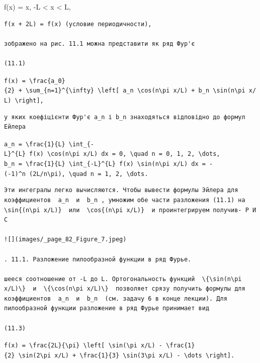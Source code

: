\documentclass[
  ukrainian,
]{article}
\begin{document}
f(x) = x, -L \textless{} x \textless{} L,

\begin{verbatim}
f(x + 2L) = f(x) (условие периодичности),

зображено на рис. 11.1 можна представити як ряд Фур'є

(11.1)
\end{verbatim}

\texttt{f(x)\ =\ \textbackslash{}frac\{a\_0\}\{2\}\ +\ \textbackslash{}sum\_\{n=1\}\^{}\{\textbackslash{}infty\}\ \textbackslash{}left{[}\ a\_n\ \textbackslash{}cos(n\textbackslash{}pi\ x/L)\ +\ b\_n\ \textbackslash{}sin(n\textbackslash{}pi\ x/L)\ \textbackslash{}right{]},}

\begin{verbatim}
у яких коефіцієнти Фур'є a_n і b_n знаходяться відповідно до формул Ейлера
\end{verbatim}

\texttt{a\_n\ =\ \textbackslash{}frac\{1\}\{L\}\ \textbackslash{}int\_\{-L\}\^{}\{L\}\ f(x)\ \textbackslash{}cos(n\textbackslash{}pi\ x/L)\ dx\ =\ 0,\ \textbackslash{}quad\ n\ =\ 0,\ 1,\ 2,\ \textbackslash{}dots,}
\texttt{b\_n\ =\ \textbackslash{}frac\{1\}\{L\}\ \textbackslash{}int\_\{-L\}\^{}\{L\}\ f(x)\ \textbackslash{}sin(n\textbackslash{}pi\ x/L)\ dx\ =\ -(-1)\^{}n\ (2L/n\textbackslash{}pi),\ \textbackslash{}quad\ n\ =\ 1,\ 2,\ \textbackslash{}dots.}

\begin{verbatim}
Эти ингегралы легко вычисляются. Чтобы вывести формулы Эйлера для коэффициентов  a_n  и  b_n , умножим обе части разложения (11.1) на  \sin{(n\pi x/L)}  или  \cos{(n\pi x/L)}  и проинтегрируем получив- Р И С

![](images/_page_82_Figure_7.jpeg)

. 11.1. Разложение пилообразной функции в ряд Фурье.

шееся соотношение от -L до L. Ортогональность функций  \{\sin(n\pi x/L)\}  и  \{\cos(n\pi x/L)\}  позволяет срязу получить формулы для коэффициентов  a_n  и  b_n  (см. задачу 6 в конце лекции). Для пилообразной функции разложение в ряд Фурье принимает вид

(11.3)
\end{verbatim}

\texttt{f(x)\ =\ \textbackslash{}frac\{2L\}\{\textbackslash{}pi\}\ \textbackslash{}left{[}\ \textbackslash{}sin(\textbackslash{}pi\ x/L)\ -\ \textbackslash{}frac\{1\}\{2\}\ \textbackslash{}sin(2\textbackslash{}pi\ x/L)\ +\ \textbackslash{}frac\{1\}\{3\}\ \textbackslash{}sin(3\textbackslash{}pi\ x/L)\ -\ \textbackslash{}dots\ \textbackslash{}right{]}.}
\end{document}
